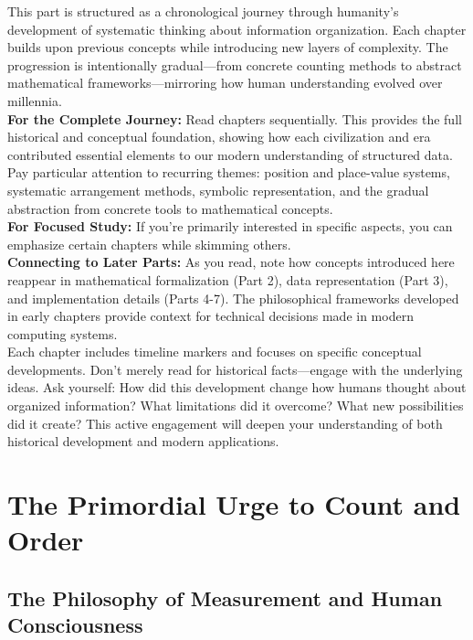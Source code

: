 \documentclass[12pt, oneside, openany]{book}
\begin{document}
This part is structured as a chronological journey through humanity's development of systematic thinking about information organization. Each chapter builds upon previous concepts while introducing new layers of complexity. The progression is intentionally gradual—from concrete counting methods to abstract mathematical frameworks—mirroring how human understanding evolved over millennia.\\
\textbf{For the Complete Journey:} Read chapters sequentially. This provides the full historical and conceptual foundation, showing how each civilization and era contributed essential elements to our modern understanding of structured data. Pay particular attention to recurring themes: position and place-value systems, systematic arrangement methods, symbolic representation, and the gradual abstraction from concrete tools to mathematical concepts.\\
\textbf{For Focused Study:} If you're primarily interested in specific aspects, you can emphasize certain chapters while skimming others.\\
\textbf{Connecting to Later Parts:} As you read, note how concepts introduced here reappear in mathematical formalization (Part 2), data representation (Part 3), and implementation details (Parts 4-7). The philosophical frameworks developed in early chapters provide context for technical decisions made in modern computing systems.\\
Each chapter includes timeline markers and focuses on specific conceptual developments. Don't merely read for historical facts—engage with the underlying ideas. Ask yourself: How did this development change how humans thought about organized information? What limitations did it overcome? What new possibilities did it create? This active engagement will deepen your understanding of both historical development and modern applications.


\chapter{The Primordial Urge to Count and Order}

\section{The Philosophy of Measurement and Human Consciousness}
\end{document}
